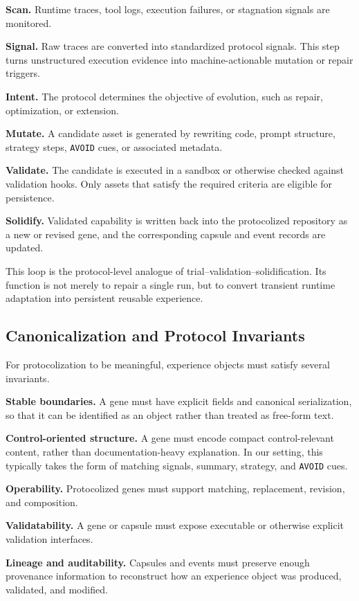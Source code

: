 \documentclass{article}
\newcommand{\nbf}[1]{{\noindent \textbf{#1}}}
\begin{document}
\nbf{Scan.}
Runtime traces, tool logs, execution failures, or stagnation signals are monitored.

\nbf{Signal.}
Raw traces are converted into standardized protocol signals. 
This step turns unstructured execution evidence into machine-actionable mutation or repair triggers.

\nbf{Intent.}
The protocol determines the objective of evolution, such as repair, optimization, or extension.

\nbf{Mutate.}
A candidate asset is generated by rewriting code, prompt structure, strategy steps, \texttt{AVOID} cues, or associated metadata.

\nbf{Validate.}
The candidate is executed in a sandbox or otherwise checked against validation hooks. 
Only assets that satisfy the required criteria are eligible for persistence.

\nbf{Solidify.}
Validated capability is written back into the protocolized repository as a new or revised gene, and the corresponding capsule and event records are updated.

This loop is the protocol-level analogue of trial--validation--solidification. 
Its function is not merely to repair a single run, but to convert transient runtime adaptation into persistent reusable experience.

\subsection{Canonicalization and Protocol Invariants}
\label{app:gep_invariants}

For protocolization to be meaningful, experience objects must satisfy several invariants.

\nbf{Stable boundaries.}
A gene must have explicit fields and canonical serialization, so that it can be identified as an object rather than treated as free-form text.

\nbf{Control-oriented structure.}
A gene must encode compact control-relevant content, rather than documentation-heavy explanation. 
In our setting, this typically takes the form of matching signals, summary, strategy, and \texttt{AVOID} cues.

\nbf{Operability.}
Protocolized genes must support matching, replacement, revision, and composition.

\nbf{Validatability.}
A gene or capsule must expose executable or otherwise explicit validation interfaces.

\nbf{Lineage and auditability.}
Capsules and events must preserve enough provenance information to reconstruct how an experience object was produced, validated, and modified.
\end{document}
